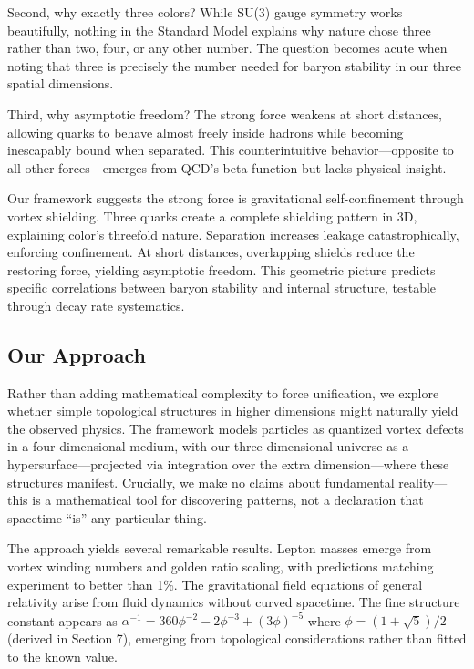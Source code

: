 Second, why exactly three colors? While SU(3) gauge symmetry works beautifully, nothing in the Standard Model explains why nature chose three rather than two, four, or any other number. The question becomes acute when noting that three is precisely the number needed for baryon stability in our three spatial dimensions.

Third, why asymptotic freedom? The strong force weakens at short distances, allowing quarks to behave almost freely inside hadrons while becoming inescapably bound when separated. This counterintuitive behavior---opposite to all other forces---emerges from QCD's beta function but lacks physical insight.

Our framework suggests the strong force is gravitational self-confinement through vortex shielding. Three quarks create a complete shielding pattern in 3D, explaining color's threefold nature. Separation increases leakage catastrophically, enforcing confinement. At short distances, overlapping shields reduce the restoring force, yielding asymptotic freedom. This geometric picture predicts specific correlations between baryon stability and internal structure, testable through decay rate systematics.

\subsection{Our Approach}

Rather than adding mathematical complexity to force unification, we explore whether simple topological structures in higher dimensions might naturally yield the observed physics. The framework models particles as quantized vortex defects in a four-dimensional medium, with our three-dimensional universe as a hypersurface---projected via integration over the extra dimension---where these structures manifest. Crucially, we make no claims about fundamental reality---this is a mathematical tool for discovering patterns, not a declaration that spacetime ``is'' any particular thing.

The approach yields several remarkable results. Lepton masses emerge from vortex winding numbers and golden ratio scaling, with predictions matching experiment to better than 1\%. The gravitational field equations of general relativity arise from fluid dynamics without curved spacetime. The fine structure constant appears as $\alpha^{-1} = 360\phi^{-2} - 2\phi^{-3} + (3\phi)^{-5}$ where $\phi = (1+\sqrt{5})/2$ (derived in Section 7), emerging from topological considerations rather than fitted to the known value.

